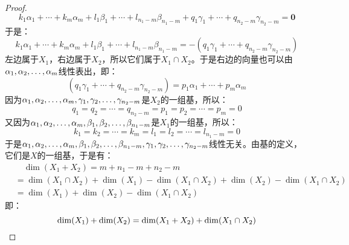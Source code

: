 \begin{proof}
	\begin{equation*}
		k_1\alpha_1+\cdots+k_m\alpha_m+l_1\beta_1+\cdots+l_{n_1-m}\beta_{n_1-m}+q_1\gamma_1+\cdots+q_{n_2-m}\gamma_{n_2-m}=\mathbf{0}
	\end{equation*}
	于是：
	\begin{equation*}
		k_1\alpha_1+\cdots+k_m\alpha_m+l_1\beta_1+\cdots+l_{n_1-m}\beta_{n_1-m}=-(q_1\gamma_1+\cdots+q_{n_2-m}\gamma_{n_2-m})
	\end{equation*}
	左边属于$X_1$，右边属于$X_2$，所以它们属于$X_1\cap X_2$。于是右边的向量也可以由$\alpha_1, \alpha_2, \dots, \alpha_{m}$线性表出，即：
	\begin{equation*}
		(q_1\gamma_1+\cdots+q_{n_2-m}\gamma_{n_2-m})=p_1\alpha_1+\cdots+p_m\alpha_m
	\end{equation*}
	因为$\alpha_1, \alpha_2, \dots, \alpha_{m},\gamma_1, \gamma_2, \dots, \gamma_{n_2-m}$是$X_2$的一组基，所以：
	\begin{equation*}
		q_1=q_2=\cdots=q_{n_2-m}=p_1=p_2=\cdots=p_m=0
	\end{equation*}
	又因为$\alpha_1, \alpha_2, \dots, \alpha_{m},\beta_1, \beta_2, \dots, \beta_{n_1-m}$是$X_1$的一组基，所以：
	\begin{equation*}
		k_1=k_2=\cdots=k_m=l_1=l_2=\cdots=l_{n_1-m}=0
	\end{equation*}
	于是$\alpha_1, \alpha_2, \dots, \alpha_{m},\beta_1, \beta_2, \dots, \beta_{n_1-m},\gamma_1, \gamma_2, \dots, \gamma_{n_2-m}$线性无关。由基的定义，它们是$X$的一组基，于是有：
	\begin{align*}
		&\quad\dim(X_1+X_2)
		=m+n_1-m+n_2-m \\
		&=\dim(X_1\cap X_2)+\dim(X_1)-\dim(X_1\cap X_2)+\dim(X_2)-\dim(X_1\cap X_2) \\
		&=\dim(X_1)+\dim(X_2)-\dim(X_1\cap X_2)
	\end{align*}
	即：
	\begin{equation*}
		\dim(X_1)+\dim(X_2)=\dim(X_1+X_2)+\dim(X_1\cap X_2)\qedhere
	\end{equation*}
\end{proof}
